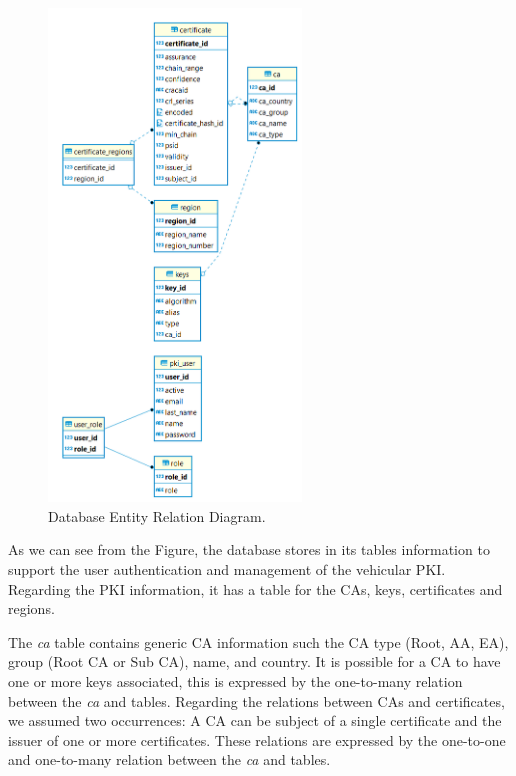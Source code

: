 \begin{figure}[!h]
	\centering
	\includegraphics[width=0.6\textwidth]{Figures/db_diagram}
	\caption{\label{fig:database_diagram}Database Entity Relation Diagram.}
\end{figure}

As we can see from the Figure, the database stores in its tables information to support the user authentication and management of the vehicular PKI. Regarding the PKI information, it has a table for the CAs, keys, certificates and regions. 

The \textit{ca} table contains generic CA information such the CA type (Root, AA, EA), group (Root CA or Sub CA), name, and country. It is possible for a CA to have one or more keys associated, this is expressed by the one-to-many relation between the \textit{ca} and  tables. Regarding the relations between CAs and certificates, we assumed two occurrences: A CA can be subject of a single certificate and the issuer of one or more certificates. These relations are expressed by the one-to-one and one-to-many relation between the \textit{ca} and  tables.

